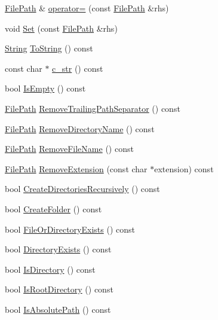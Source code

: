 \begin{DoxyCompactItemize}
\item 
\hyperlink{classtesting_1_1internal_1_1FilePath}{\-File\-Path} \& \hyperlink{classtesting_1_1internal_1_1FilePath_a56ce97a342d8d71d4abedca3f5666ab1}{operator=} (const \hyperlink{classtesting_1_1internal_1_1FilePath}{\-File\-Path} \&rhs)
\item 
void \hyperlink{classtesting_1_1internal_1_1FilePath_a42b263db98b0796b43578baca9ba991d}{\-Set} (const \hyperlink{classtesting_1_1internal_1_1FilePath}{\-File\-Path} \&rhs)
\item 
\hyperlink{classtesting_1_1internal_1_1String}{\-String} \hyperlink{classtesting_1_1internal_1_1FilePath_abf9cb98d5859802d6b90f01feda7b3ff}{\-To\-String} () const 
\item 
const char $\ast$ \hyperlink{classtesting_1_1internal_1_1FilePath_a89da6be964480b4c86334e4e337d3cf2}{c\-\_\-str} () const 
\item 
bool \hyperlink{classtesting_1_1internal_1_1FilePath_aaef62c8761ddd1b95824fc57b1b277b5}{\-Is\-Empty} () const 
\item 
\hyperlink{classtesting_1_1internal_1_1FilePath}{\-File\-Path} \hyperlink{classtesting_1_1internal_1_1FilePath_a1591ddf32643fbba08640b56ad0db787}{\-Remove\-Trailing\-Path\-Separator} () const 
\item 
\hyperlink{classtesting_1_1internal_1_1FilePath}{\-File\-Path} \hyperlink{classtesting_1_1internal_1_1FilePath_afd5923a9e5f0d145f5c8fb80632c3683}{\-Remove\-Directory\-Name} () const 
\item 
\hyperlink{classtesting_1_1internal_1_1FilePath}{\-File\-Path} \hyperlink{classtesting_1_1internal_1_1FilePath_a9ad8a320421b2fe1c85e06903bf41d66}{\-Remove\-File\-Name} () const 
\item 
\hyperlink{classtesting_1_1internal_1_1FilePath}{\-File\-Path} \hyperlink{classtesting_1_1internal_1_1FilePath_ae9ec6c56e683314774276edffe880b7d}{\-Remove\-Extension} (const char $\ast$extension) const 
\item 
bool \hyperlink{classtesting_1_1internal_1_1FilePath_a49b3a8b7be27e6d2078698fb6345b5ce}{\-Create\-Directories\-Recursively} () const 
\item 
bool \hyperlink{classtesting_1_1internal_1_1FilePath_a988899e91e5f3b4a2e45bff194b91077}{\-Create\-Folder} () const 
\item 
bool \hyperlink{classtesting_1_1internal_1_1FilePath_a99532f523e54a6fd518ca846f0432908}{\-File\-Or\-Directory\-Exists} () const 
\item 
bool \hyperlink{classtesting_1_1internal_1_1FilePath_ae80e3c699144352575ec0eb29e604810}{\-Directory\-Exists} () const 
\item 
bool \hyperlink{classtesting_1_1internal_1_1FilePath_a6182eccf926d4fbba353514cf3d78b8a}{\-Is\-Directory} () const 
\item 
bool \hyperlink{classtesting_1_1internal_1_1FilePath_a9de4c1bffbbf501382c70dc0a73ed148}{\-Is\-Root\-Directory} () const 
\item 
bool \hyperlink{classtesting_1_1internal_1_1FilePath_a4dfd2cf07691a13cacc54a1fc975a609}{\-Is\-Absolute\-Path} () const 
\end{DoxyCompactItemize}
